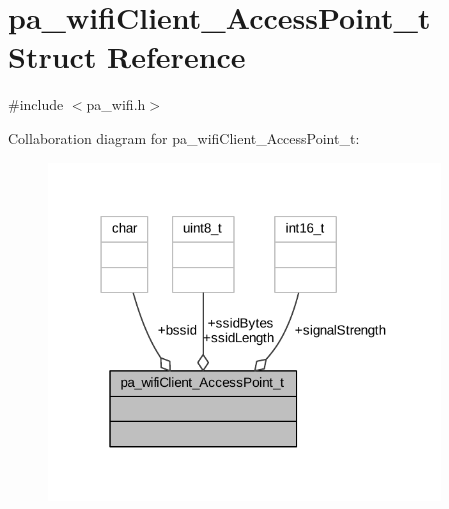 \hypertarget{structpa__wifi_client___access_point__t}{}\section{pa\+\_\+wifi\+Client\+\_\+\+Access\+Point\+\_\+t Struct Reference}
\label{structpa__wifi_client___access_point__t}


{\ttfamily \#include $<$pa\+\_\+wifi.\+h$>$}



Collaboration diagram for pa\+\_\+wifi\+Client\+\_\+\+Access\+Point\+\_\+t\+:
\nopagebreak
\begin{figure}[H]
\begin{center}
\leavevmode
\includegraphics[width=295pt]{structpa__wifi_client___access_point__t__coll__graph}
\end{center}
\end{figure}
